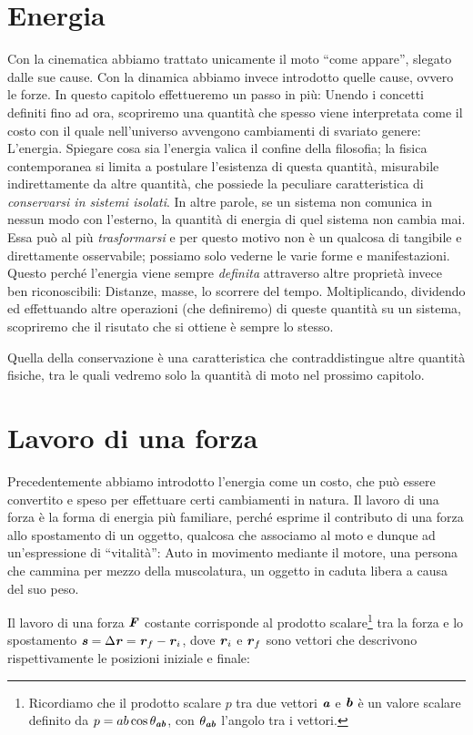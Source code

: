 \marginpar{\minitoc}

\section{Energia}
Con la cinematica abbiamo trattato unicamente il moto ``come appare'', slegato
dalle sue cause. Con la dinamica abbiamo invece introdotto quelle cause, ovvero le
forze. In questo capitolo effettueremo un passo in più: Unendo
i concetti definiti fino ad ora, scopriremo una quantità che spesso viene
interpretata come il costo con il quale nell'universo avvengono cambiamenti di
svariato genere: L'energia. Spiegare cosa sia l'energia valica il confine della
filosofia; la fisica contemporanea si limita a postulare l'esistenza di questa
quantità, misurabile indirettamente da altre quantità, che possiede la peculiare
caratteristica di \textit{conservarsi in sistemi isolati}. In altre parole, se un
sistema non comunica in nessun modo con l'esterno, la quantità di energia di
quel sistema non cambia mai. Essa può al più \textit{trasformarsi} e per questo
motivo non è un qualcosa di tangibile e direttamente osservabile; possiamo solo
vederne le varie forme e manifestazioni. Questo perché l'energia viene sempre
\textit{definita} attraverso altre proprietà invece ben riconoscibili: Distanze,
masse, lo scorrere del tempo. Moltiplicando, dividendo ed effettuando altre
operazioni (che definiremo) di queste quantità su un sistema, scopriremo che
il risutato che si ottiene è sempre lo stesso.

Quella della conservazione è una caratteristica che contraddistingue altre
quantità fisiche, tra le quali vedremo solo la quantità di moto nel prossimo
capitolo.


\section{Lavoro di una forza}
Precedentemente abbiamo introdotto
l'energia come un costo, che può essere convertito e speso per effettuare certi
cambiamenti in natura. Il lavoro di una forza è la forma di energia più familiare,
perché esprime il contributo di una forza allo spostamento di un oggetto, qualcosa
che associamo al moto e dunque ad un'espressione di ``vitalità'': Auto in movimento
mediante il motore,
una persona che cammina per mezzo della muscolatura, un oggetto in caduta libera a
causa del suo peso.

Il lavoro di una forza $\textbf{\textit{F}}$ costante corrisponde al prodotto scalare\footnote{Ricordiamo
che il prodotto scalare $p$ tra due vettori $\textbf{\textit{a}}$ e $\textbf{\textit{b}}$ è un valore scalare
definito da $p = ab\cos\theta_{\textbf{\textit{ab}}}$, con $\theta_{\textbf{\textit{ab}}}$
l'angolo tra i vettori.}
tra la forza e lo spostamento $\textbf{\textit{s}} = \Delta\textbf{\textit{r}} = \textbf{\textit{r}}_f - \textbf{\textit{r}}_i$,
dove $\textbf{\textit{r}}_i$ e $\textbf{\textit{r}}_f$ sono vettori che descrivono rispettivamente
le posizioni iniziale e finale:

